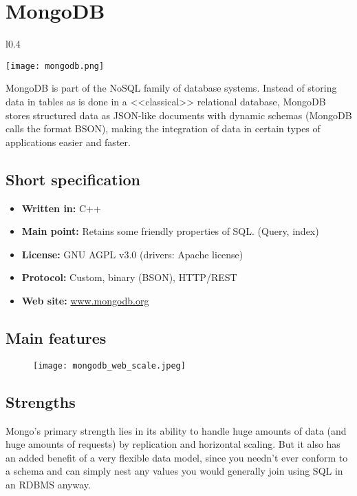 \chapter{MongoDB}

\begin{wrapfigure}{l}{0.4\textwidth}
  \vspace{-75pt}
  \begin{center}
    \texttt{[image: mongodb.png]}
  \end{center}
  \vspace{-30pt}
\end{wrapfigure}
MongoDB is part of the NoSQL family of database systems. Instead of storing data in tables as is done in a <<classical>> relational database, MongoDB stores structured data as JSON-like documents with dynamic schemas (MongoDB calls the format BSON), making the integration of data in certain types of applications easier and faster.

\section{Short specification}

\begin{itemize}
  \item \textbf{Written in:} C++
  \item \textbf{Main point:} Retains some friendly properties of SQL. (Query, index)
  \item \textbf{License:} GNU AGPL v3.0 (drivers: Apache license)
  \item \textbf{Protocol:} Custom, binary (BSON), HTTP/REST
  \item \textbf{Web site:} \href{http://www.mongodb.org/}{www.mongodb.org}
\end{itemize}

\section{Main features}

\begin{figure}[hb]
  \centering
  \texttt{[image: mongodb\_web\_scale.jpeg]}
\end{figure}

\section{Strengths}

Mongo's primary strength lies in its ability to handle huge amounts of data (and huge amounts of requests) by replication and horizontal scaling. But it also has an added benefit of a very flexible data model, since you needn’t ever conform to a schema and can simply nest any values you would generally join using SQL in an RDBMS anyway.

